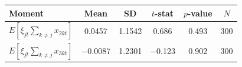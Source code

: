\begin{tabular}{lccccc}
\toprule
Moment & Mean & SD & $t$-stat & $p$-value & $N$ \\
\midrule
$E[\xi_{jt}\sum_{k\neq j}x_{2kt}]$ & 0.0457 & 1.1542 & 0.686 & 0.493 & 300 \\
$E[\xi_{jt}\sum_{k\neq j}x_{3kt}]$ & $-$0.0087 & 1.2301 & $-$0.123 & 0.902 & 300 \\
\bottomrule
\end{tabular}
